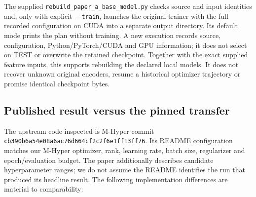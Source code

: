 \documentclass[11pt,a4paper]{article}
\begin{document}
The supplied \texttt{rebuild\_paper\_a\_base\_model.py} checks source and input identities and, only with explicit \texttt{-{}-train}, launches the original trainer with the full recorded configuration on CUDA into a separate output directory. Its default mode prints the plan without training. A new execution records source, configuration, Python/PyTorch/CUDA and GPU information; it does not select on TEST or overwrite the retained checkpoint. Together with the exact supplied feature inputs, this supports rebuilding the declared local models. It does not recover unknown original encoders, resume a historical optimizer trajectory or promise identical checkpoint bytes.

\FloatBarrier
\subsection{Published result versus the pinned transfer}

The upstream code inspected is M-Hyper commit \texttt{cb390b6a54e08a6ac76d664cf2c2f6e1ff13ff76}. Its README configuration matches our M-Hyper optimizer, rank, learning rate, batch size, regularizer and epoch/evaluation budget. The paper additionally describes candidate hyperparameter ranges; we do not assume the README identifies the run that produced its headline result. The following implementation differences are material to comparability:
\end{document}
